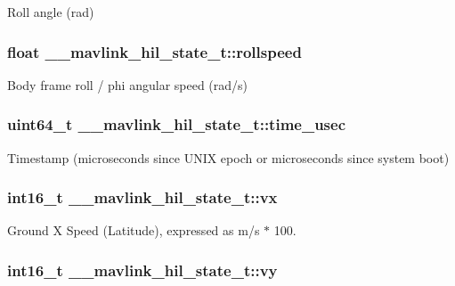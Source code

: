 Roll angle (rad) 

\hypertarget{struct____mavlink__hil__state__t_a308aa515448a4d8d25131ce7c0f3254d}{
\subsubsection[{rollspeed}]{\setlength{\rightskip}{0pt plus 5cm}float \+\_\+\+\_\+mavlink\+\_\+hil\+\_\+state\+\_\+t\+::rollspeed}}\label{struct____mavlink__hil__state__t_a308aa515448a4d8d25131ce7c0f3254d}


Body frame roll / phi angular speed (rad/s) 

\hypertarget{struct____mavlink__hil__state__t_a19f9efdaaddd6d9699f8225bf5a4d4ef}{
\subsubsection[{time\+\_\+usec}]{\setlength{\rightskip}{0pt plus 5cm}uint64\+\_\+t \+\_\+\+\_\+mavlink\+\_\+hil\+\_\+state\+\_\+t\+::time\+\_\+usec}}\label{struct____mavlink__hil__state__t_a19f9efdaaddd6d9699f8225bf5a4d4ef}


Timestamp (microseconds since U\+N\+I\+X epoch or microseconds since system boot) 

\hypertarget{struct____mavlink__hil__state__t_a8ea365258210e69427e6c02f82aa710c}{
\subsubsection[{vx}]{\setlength{\rightskip}{0pt plus 5cm}int16\+\_\+t \+\_\+\+\_\+mavlink\+\_\+hil\+\_\+state\+\_\+t\+::vx}}\label{struct____mavlink__hil__state__t_a8ea365258210e69427e6c02f82aa710c}


Ground X Speed (Latitude), expressed as m/s $\ast$ 100. 

\hypertarget{struct____mavlink__hil__state__t_a8d3234cf343035ab3f240f23fac95072}{
\subsubsection[{vy}]{\setlength{\rightskip}{0pt plus 5cm}int16\+\_\+t \+\_\+\+\_\+mavlink\+\_\+hil\+\_\+state\+\_\+t\+::vy}}\label{struct____mavlink__hil__state__t_a8d3234cf343035ab3f240f23fac95072}


